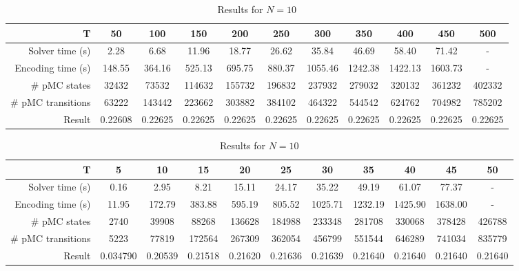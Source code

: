 \begin{sidewaystable}
\centering
\begin{tabular}{|r|c|c|c|c|c|c|c|c|c|c|}
\hline
T & 50 & 100 & 150 & 200 & 250 & 300 & 350 & 400 & 450 & 500 \\ \hline
Solver time (s) & 2.28 & 6.68 & 11.96 & 18.77 & 26.62 & 35.84 & 46.69 & 58.40 & 71.42 & - \\
Encoding time (s) & 148.55 & 364.16 & 525.13 & 695.75 & 880.37 & 1055.46 & 1242.38 & 1422.13 & 1603.73 & - \\
\# pMC states & 32432 & 73532 & 114632 & 155732 & 196832 & 237932 & 279032 & 320132 & 361232 & 402332 \\
\# pMC transitions & 63222 & 143442 & 223662 & 303882 & 384102 & 464322 & 544542 & 624762 & 704982 & 785202 \\
Result & 0.22608 & 0.22625 & 0.22625 & 0.22625 & 0.22625 & 0.22625 & 0.22625 & 0.22625 & 0.22625 & 0.22625 \\	 \hline
\end{tabular}
\caption{Results for $N=5$}


\vspace{2\baselineskip}
\begin{tabular}{|r|c|c|c|c|c|c|c|c|c|c|}
\hline
T & 5 & 10 & 15 & 20 & 25 & 30 & 35 & 40 & 45 & 50\\ \hline
Solver time (s) & 0.16 & 2.95 & 8.21 & 15.11 & 24.17 & 35.22 & 49.19 & 61.07 & 77.37 & - \\
Encoding time (s) & 
11.95 & 172.79 & 383.88 & 595.19 & 805.52 & 1025.71 & 1232.19 & 1425.90 & 1638.00 & - \\
\# pMC states & 2740 & 39908 & 88268 & 136628 & 184988 & 233348 & 281708 & 330068 & 378428 & 426788 \\
\# pMC transitions & 5223 & 77819 & 172564 & 267309 & 362054 & 456799 & 551544 & 646289 & 741034 & 835779 \\
Result & 
0.034790 & 0.20539 & 0.21518 & 0.21620 & 0.21636 & 0.21639 & 0.21640 & 0.21640 & 0.21640 & 0.21640 \\ \hline
\end{tabular}
\caption{Results for $N=10$}

\end{sidewaystable}

